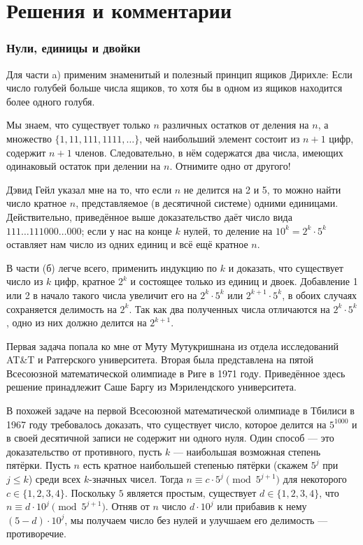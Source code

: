 \section*{Решения и комментарии}

\subsubsection*{Нули, единицы и двойки}%

Для части a) применим знаменитый и полезный принцип ящиков Дирихле:
Если число голубей больше числа ящиков, то хотя бы в одном из ящиков находится более одного голубя.

Мы знаем, что существует только $n$ различных остатков от деления на $n$, а множество $\{1, 11, 111, 1111,\dots\}$, чей наибольший элемент
состоит из $n+1$ цифр, содержит $n+1$ членов.
Следовательно, в нём содержатся два числа, имеющих одинаковый остаток при делении на $n$.
Отнимите одно от другого!
\heart

Дэвид Гейл %
указал мне на то, %
что если $n$ не делится на 2 и 5, то можно найти число кратное $n$, представляемое (в десятичной системе) одними единицами.
Действительно, приведённое выше доказательство даёт число вида $111\dots111000\dots000$; 
если у нас на конце $k$ нулей, то деление на $10^k=2^k\cdot 5^k$ оставляет нам число из одних единиц и всё ещё кратное $n$.

В части (б) легче всего, применить индукцию по $k$
и доказать, что существует число из $k$ цифр, кратное $2^k$ и состоящее только из единиц и двоек.
Добавление 1 или 2 в начало такого числа увеличит его на $2^k\cdot 5^k$ или $2^{k+1}\cdot 5^k$, в обоих случаях сохраняется делимость на $2^k$.
Так как два полученных числа отличаются на $2^k\cdot 5^k$, одно из них должно делится на $2^{k+1}$.
\heart

Первая задача попала ко мне от Муту Мутукришнана %
из отдела исследований AT\&T и Ратгерского университета.
Вторая была представлена на пятой Всесоюзной математической олимпиаде в Риге в 1971 году.
Приведённое здесь решение принадлежит Саше Баргу %
из Мэрилендского университета.

\medskip

В похожей задаче на первой Всесоюзной математической олимпиаде в Тбилиси в 1967 году требовалось доказать, что существует число, которое делится на $5^{1000}$ и в своей десятичной записи не содержит ни одного нуля.
Один способ --- это доказательство от противного, 
пусть $k$ --- наибольшая возможная степень пятёрки.
Пусть $n$ есть кратное наибольшей степенью пятёрки (скажем $5^j$ при $j\le k$)
среди всех $k$-значных чисел.
Тогда $n\equiv c\cdot 5^j\pmod{5^{j+1}}$ для некоторого $c\in\{1,2,3,4\}$.
Поскольку $5$ является простым, существует $d\in\{1,2,3,4\}$, что $n\equiv d\cdot 10^j\pmod{5^{j+1}}$.
Отняв от $n$ число $d\cdot 10^{j}$ или прибавив к нему $(5-d)\cdot 10^{j}$, мы получаем число без нулей и улучшаем его делимость --- противоречие.
\heart

